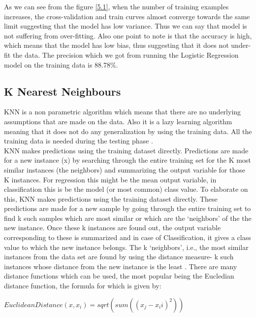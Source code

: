 As we can see from the figure \ref{5.1}, when the number of training examples increases, the cross-validation and train curves almost converge towards the same limit suggesting that the model has low variance. Thus we can say that model is not suffering from over-fitting. Also one point to note is that the accuracy is high, which means that the model has low bias, thus suggesting that it does not under-fit the data. The precision which we got from running the Logistic Regression model on the training data is 88.78\%.

\subsection{K Nearest Neighbours}
KNN is a non parametric algorithm which means that there are no underlying assumptions that are made on the data. Also it is a lazy learning algorithm meaning that it does not do any generalization by using the training data. All the training data is needed during the testing phase \cite{link11}.\\
KNN makes predictions using the training dataset directly. Predictions are made for a new instance (x) by searching through the entire training set for the K most similar instances (the neighbors) and summarizing the output variable for those K instances. For regression this might be the mean output variable, in classification this is be the model (or most common) class value. To elaborate on this, KNN makes predictions using the training dataset directly. These predictions are made for a new sample by going through the entire training set to find k such samples which are most similar or which are the `neighbors' of the the new instance. Once these k instances are found out, the output variable corresponding to these is summarized and in case of Classification, it gives a class value to which the new instance belongs. The k `neighbors', i.e., the most similar instances from the data set are found by using the distance measure- k such instances whose distance from the new instance is the least \cite{link11}. There are many distance functions which can be used, the most popular being the Eucledian distance function, the formula for which is given by:

$EuclideanDistance(x, x_i) = sqrt( sum( (x_j-x_ii)^2 ) )$

